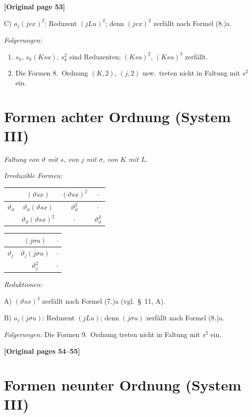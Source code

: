 \documentclass[12pt,a4paper]{article}
\begin{document}
\noindent\textbf{[Original page 53]}

C) $a_j(jvx)^2$: Reduzent $(jLu)^2$; denn $(jvx)^2$ zerfällt nach Formel (8.)a.

\textit{Folgerungen:}
\begin{enumerate}
\item[1)] $s_k$, $s_k(Ksu)$, $s_k^2$ sind Reduzenten; $(Ksu)^2$, $(Ksu)^3$ zerfällt.
\item[2)] Die Formen 8.\ Ordnung $(K,2)$, $(j,2)$ usw.\ treten nicht in Faltung mit $s^2$ ein.
\end{enumerate}

\section{Formen achter Ordnung (System III)}

\textit{Faltung von $\vartheta$ mit $s$, von $j$ mit $\sigma$, von $K$ mit $L$.}

\textit{Irreduzible Formen:}
\begin{center}
\begin{tabular}{c|ccc}
& $(\vartheta sx)$ & $(\vartheta sx)^2$ & $\cdot$ \\
\hline
$\vartheta_\vartheta$ & $\vartheta_\vartheta(\vartheta sx)$ & $\vartheta_\vartheta^2$ & $\cdot$ \\
& $\vartheta_\vartheta(\vartheta sx)^2$ & $\cdot$ & $\vartheta_\vartheta^3$
\end{tabular}
\end{center}

\begin{center}
\begin{tabular}{c|cc}
& $(j\sigma u)$ & $\cdot$ \\
\hline
$\vartheta_j$ & $\vartheta_j(j\sigma u)$ & $\cdot$ \\
& $\vartheta_j^2$ & $\cdot$
\end{tabular}
\end{center}

\textit{Reduktionen:}

A) $(\vartheta sx)^3$ zerfällt nach Formel (7.)a (vgl.\ \S\ 11, A).

B) $a_j(j\sigma u)$: Reduzent $(jLu)$; denn $(j\sigma u)$ zerfällt nach Formel (8.)a.

\textit{Folgerungen:} Die Formen 9.\ Ordnung treten nicht in Faltung mit $s^2$ ein.

\noindent\textbf{[Original pages 54--55]}

\section{Formen neunter Ordnung (System III)}
\end{document}
